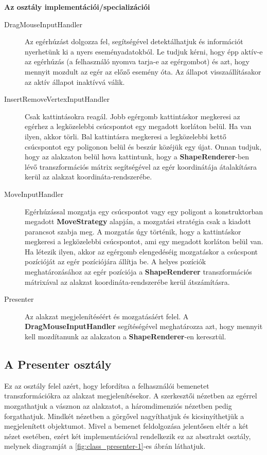 \textbf{Az osztály implementációi/specializációi}

\begin{description}
	\item[DragMouseInputHandler] Az egérhúzást dolgozza fel, segítségével detektálhatjuk és információt nyerhetünk ki a nyers eseményadatokból. Le tudjuk kérni, hogy épp aktív-e az egérhúzás (a felhasználó nyomva tarja-e az egérgombot) és azt, hogy mennyit mozdult az egér az előző esemény óta. Az állapot visszaállításakor az aktív állapot inaktívvá válik.
	\item[InsertRemoveVertexInputHandler] Csak kattintásokra reagál. Jobb egérgomb kattintáskor megkeresi az egérhez a legközelebbi csúcspontot egy megadott korláton belül. Ha van ilyen, akkor törli. Bal kattintásra megkeresi a legközelebbi kettő csúcspontot egy poligonon belül és beszúr közéjük egy újat. Onnan tudjuk, hogy az alakzaton belül hova kattintunk, hogy a \textbf{ShapeRenderer}-ben lévő transzformációs mátrix segítségével az egér koordinátája átalakításra kerül az alakzat koordináta-rendszerébe.
	\item[MoveInputHandler] Egérhúzással mozgatja egy csúcspontot vagy egy poligont a konstruktorban megadott \textbf{MoveStrategy} alapján, a mozgatási stratégia csak a kiadott parancsot szabja meg. A mozgatás úgy történik, hogy a kattintáskor megkeresi a legközelebbi csúcspontot, ami egy megadott korláton belül van. Ha létezik ilyen, akkor az egérgomb elengedéséig mozgatáskor a csúcspont pozícióját az egér pozíciójára állítja be. A helyes pozíciók meghatározásához az egér pozíciója a \textbf{ShapeRenderer} transzformációs mátrixával az alakzat koordináta-rendszerébe kerül átszámításra.
	\item[Presenter] Az alakzat megjelenítéséért és mozgatásáért felel. A \textbf{DragMouseInputHandler} segítéségével meghatározza azt, hogy mennyit kell mozdítanunk az alakzaton a \textbf{ShapeRenderer}-en keresztül.
\end{description}

\subsection{A Presenter osztály}

Ez az osztály felel azért, hogy lefordítsa a felhasználói bemenetet transzformációkra az alakzat megjelenítésekor. A szerkesztői nézetben az egérrel mozgathatjuk a vásznon az alakzatot, a háromdimenziós nézetben pedig forgathatjuk. Mindkét nézetben a görgővel nagyíthatjuk és kicsinyíthetjük a megjelenített objektumot. Mivel a bemenet feldolgozása jelentősen eltér a két nézet esetében, ezért két implementációval rendelkezik ez az absztrakt osztály, melynek diagramját a \ref{fig:class_presenter-1}-es ábrán láthatjuk.

